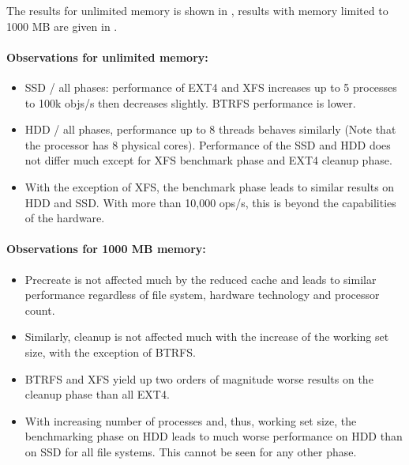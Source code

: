 \documentclass[a4paper,10pt]{article}
\begin{document}
The results for unlimited memory is shown in , results with memory limited to 1000 MB are given in  .

\paragraph{Observations for unlimited memory:}
\begin{itemize}
\item SSD / all phases: performance of EXT4 and XFS increases up to 5 processes to 100k objs/s then decreases slightly. BTRFS performance is lower.
\item HDD / all phases, performance up to 8 threads behaves similarly (Note that the processor has 8 physical cores). Performance of the SSD and HDD does not differ much except for XFS benchmark phase and EXT4 cleanup phase.
\item With the exception of XFS, the benchmark phase leads to similar results on HDD and SSD. With more than 10,000 ops/s, this is beyond the capabilities of the hardware.
\end{itemize}

\paragraph{Observations for 1000 MB memory:}

\begin{itemize}
\item Precreate is not affected much by the reduced cache and leads to similar performance regardless of file system,  hardware technology and processor count. 
\item Similarly, cleanup is not affected much with the increase of the working set size, with the exception of BTRFS.
\item BTRFS and XFS yield up two orders of magnitude worse results on the cleanup phase than all EXT4.
\item With increasing number of processes and, thus, working set size, the benchmarking phase on HDD leads to much worse performance on HDD than on SSD for all file systems. This cannot be seen for any other phase.
\end{itemize}
\end{document}
